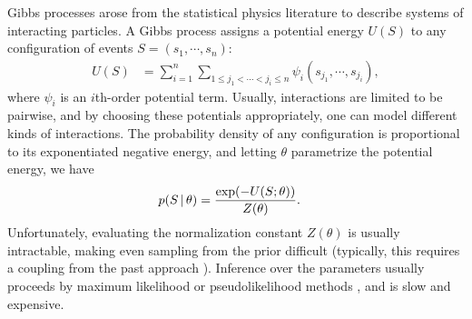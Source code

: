 \documentclass{statsoc}
\begin{document}
{Gibbs processes} \citep{DalVer2008a} arose from the statistical physics literature to describe 
systems of interacting particles. A Gibbs process assigns a potential energy $U(S)$ to any configuration of events $S = (s_1, \cdots,s_n )$: 
\vspace{-.1in}
\begin{align}
  U(S) &= \sum_{i=1}^n \sum_{1 \le j_1 < \cdots < j_i \le n} \psi_i(s_{j_1},\cdots,s_{j_i}),
\end{align}
where $\psi_i$ is an $i$th-order potential term.
Usually, interactions are limited to be pairwise, %
and by choosing these potentials appropriately, one can model different kinds of interactions. 
The probability density of any configuration is proportional to its exponentiated
negative energy, and letting $\theta$ parametrize the potential energy, we have
\begin{align}
  p(S\,|\,\theta) &= \frac{\exp(-U(S;\theta))}{Z(\theta)}.
\end{align}
Unfortunately, evaluating the normalization constant $Z(\theta)$ is usually intractable, making
even sampling from the prior difficult (typically, this requires a coupling from the past approach \citep{Moller2007}). 
Inference over the parameters usually proceeds by maximum likelihood or pseudolikelihood methods \citep{Moller2007, Mateu2001}, and is slow and expensive.
\end{document}
